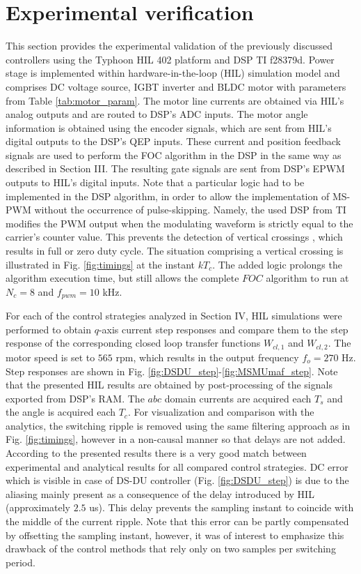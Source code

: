 \documentclass[conference]{IEEEtran}
\begin{document}
\section{Experimental verification}
This section provides the experimental validation of the previously discussed controllers using the Typhoon HIL 402 platform and DSP TI f28379d. Power stage is implemented within hardware-in-the-loop (HIL) simulation model and comprises DC voltage source, IGBT inverter and BLDC motor with parameters from Table \ref{tab:motor_param}. The motor line currents are obtained via HIL’s analog outputs and are routed to DSP's ADC inputs. The motor angle information is obtained using the encoder signals, which are sent from HIL’s digital outputs to the DSP's QEP inputs. These current and position feedback signals are used to perform the FOC algorithm in the DSP in the same way as described in Section III. The resulting gate signals are sent from DSP’s EPWM outputs to HIL's digital inputs. 
Note that a particular logic had to be implemented in the DSP algorithm, in order to allow the implementation of MS-PWM without the occurrence of pulse-skipping. Namely, the used DSP from TI modifies the PWM output when the modulating waveform is strictly equal to the carrier's counter value. This prevents the detection of vertical crossings \cite{corradini2018}, which results in full or zero duty cycle. The situation comprising a vertical crossing is illustrated in Fig. \ref{fig:timings} at the instant $kT_c$.
The added logic prolongs the algorithm execution time, but still allows the complete $FOC$ algorithm to run at $N_c=8$ and $f_{pwm} = 10$ kHz.

For each of the control strategies analyzed in Section IV, HIL simulations were performed to obtain $q$-axis current step responses and compare them to the step response of the corresponding closed loop transfer functions $W_{cl,1}$ and $W_{cl,2}$. The motor speed is set to $565$ rpm, which results in the output frequency $f_o=270$ Hz. 
Step responses are shown in Fig. \ref{fig:DSDU_step}-\ref{fig:MSMUmaf_step}. Note that the presented HIL results are obtained by post-processing of the signals exported from DSP’s RAM. The $abc$ domain currents are acquired each $T_s$ and the angle is acquired each $T_c$. 
For visualization and comparison with the analytics, the switching ripple is removed using the same filtering approach as in Fig. \ref{fig:timings}, however in a non-causal manner so that delays are not added.
According to the presented results there is a very good match between experimental and analytical results for all compared control strategies. DC error which is visible in case of DS-DU controller (Fig. \ref{fig:DSDU_step}) is due to the aliasing mainly present as a consequence of the delay introduced by HIL (approximately $2.5$ us). This delay prevents the sampling instant to coincide with the middle of the current ripple. Note that this error can be partly compensated by offsetting the sampling instant, however, it was of interest to emphasize this drawback of the control methods that rely only on two samples per switching period. 
\end{document}
